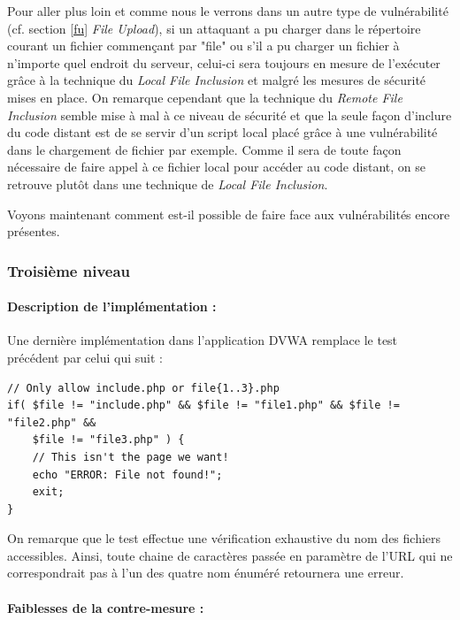 Pour aller plus loin et comme nous le verrons dans un autre type de vulnérabilité (cf. section \ref{fu} \textit{File Upload}), si un attaquant a pu charger dans le répertoire courant un fichier commençant par "file" ou s'il a pu charger un fichier à n'importe quel endroit du serveur, celui-ci sera toujours en mesure de l'exécuter grâce à la technique du \textit{Local File Inclusion} et malgré les mesures de sécurité mises en place. On remarque cependant que la technique du \textit{Remote File Inclusion} semble mise à mal à ce niveau de sécurité et que la seule façon d'inclure du code distant est de se servir d'un script local placé grâce à une vulnérabilité dans le chargement de fichier par exemple. Comme il sera de toute façon nécessaire de faire appel à ce fichier local pour accéder au code distant, on se retrouve plutôt dans une technique de \textit{Local File Inclusion}. 

Voyons maintenant comment est-il possible de faire face aux vulnérabilités encore présentes.

\subsubsection{Troisième niveau}

\paragraph{Description de l'implémentation :}

Une dernière implémentation dans l'application DVWA remplace le test précédent par celui qui suit :

\begin{lstlisting}
// Only allow include.php or file{1..3}.php
if( $file != "include.php" && $file != "file1.php" && $file != "file2.php" && 
    $file != "file3.php" ) {
    // This isn't the page we want!
    echo "ERROR: File not found!";
    exit;
}
\end{lstlisting}

On remarque que le test effectue une vérification exhaustive du nom des fichiers accessibles. Ainsi, toute chaine de caractères passée en paramètre de l'URL qui ne correspondrait pas à l'un des quatre nom énuméré retournera une erreur.

\paragraph{Faiblesses de la contre-mesure :}

